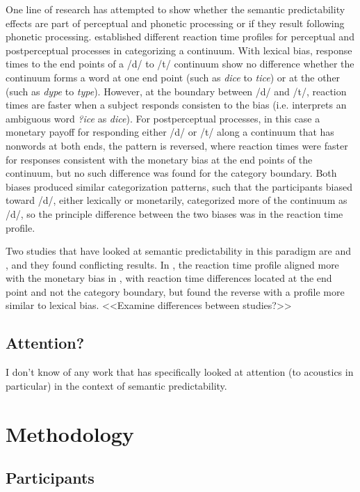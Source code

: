 One line of research has attempted to show whether the semantic predictability effects are part of perceptual and phonetic processing or if they result following phonetic processing.  \citet{Connine1987a} established different reaction time profiles for perceptual and postperceptual processes in categorizing a continuum.  With lexical bias, response times to the end points of a /d/ to /t/ continuum show no difference whether the continuum forms a word at one end point (such as \emph{dice} to \emph{tice}) or at the other (such as \emph{dype} to \emph{type}).  However, at the boundary between /d/ and /t/, reaction times are faster when a subject responds consisten to the bias (i.e. interprets an ambiguous word \emph{?ice} as \emph{dice}).  For postperceptual processes, in this case a monetary payoff for responding either /d/ or /t/ along a continuum that has nonwords at both ends, the pattern is reversed, where reaction times were faster for responses consistent with the monetary bias at the end points of the continuum, but no such difference was found for the category boundary.  Both biases produced similar categorization patterns, such that the participants biased toward /d/, either lexically or monetarily, categorized more of the continuum as /d/, so the principle difference between the two biases was in the reaction time profile.

Two studies that have looked at semantic predictability in this paradigm are \citet{Connine1987} and \citet{Borsky1998}, and they found conflicting results.  In \citet{Connine1987}, the reaction time profile aligned more with the monetary bias in \citet{Connine1987a}, with reaction time differences located at the end point and not the category boundary, but \citet{Borsky1998} found the reverse with a profile more similar to lexical bias.  <<Examine differences between studies?>>

\subsection{Attention?}

I don't know of any work that has specifically looked at attention (to acoustics in particular) in the context of semantic predictability.

\section{Methodology}

\subsection{Participants}


